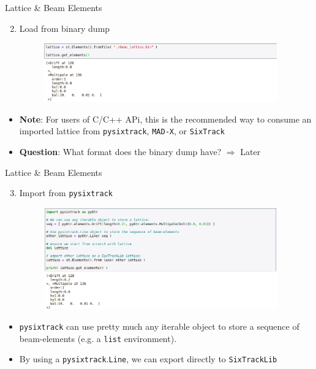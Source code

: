 \documentclass{beamer}
\begin{document}
\begin{frame}{Lattice \& Beam Elements}
\begin{enumerate}
    \setcounter{enumi}{1}
    \item Load from binary dump 
    \begin{figure}[h]
        \centering
        \includegraphics[width=0.95\textwidth]{images/lattice_02.png}
    \end{figure}
\end{enumerate}

\begin{itemize}
    \item \textbf{Note}: For users of C/C++ APi, this is the recommended way to consume an imported lattice from \texttt{pysixtrack}, \texttt{MAD-X}, or \texttt{SixTrack}
    \item \textbf{Question}: What format does the binary dump have? $\Rightarrow$ Later
\end{itemize}
\end{frame}

\begin{frame}{Lattice \& Beam Elements}
\begin{enumerate}
    \setcounter{enumi}{2}
    \item Import from \texttt{pysixtrack}
    \begin{figure}[h]
        \includegraphics[width=0.95\textwidth]{images/pysixtrack_02.png}
    \end{figure}
\end{enumerate}
\begin{itemize}
    \item \texttt{pysixtrack} can use pretty much any iterable object to store a sequence of beam-elements (e.g. a \texttt{list} environment). 
    \item By using a \texttt{pysixtrack}.\texttt{Line}, we can export directly to 
          \texttt{SixTrackLib}
\end{itemize}
\end{frame}
\end{document}
